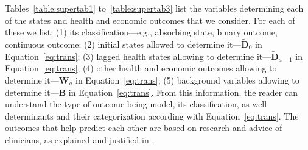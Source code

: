 Tables~\ref{table:supertab1} to~\ref{table:supertab3} list the variables determining each of the states and health and economic outcomes that we consider. For each of these we list: (1) its classification---e.g., absorbing state, binary outcome, continuous outcome; (2) initial states allowed to determine it---$\tilde{\bm{D}}_0$ in Equation~\eqref{eq:trans}; (3) lagged health states allowing to determine it---$\tilde{\bm{D}}_{a-1}$ in Equation~\eqref{eq:trans}; (4) other health and economic outcomes allowing to determine it---$\bm{W}_a$ in Equation~\eqref{eq:trans}; (5) background variables allowing to determine it---$\bm{B}$ in Equation~\eqref{eq:trans}. From this information, the reader can understand the type of outcome being model, its classification, as well determinants and their categorization according with Equation~\eqref{eq:trans}. The outcomes that help predict each other are based on research and advice of clinicians, as explained and justified in \citet{Goldman_etal_2015_Future-Elderly-Model-Report}.

